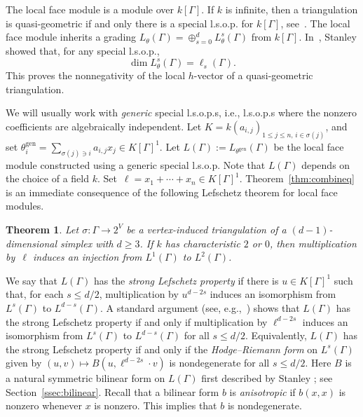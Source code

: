 \documentclass[11pt]{article}
\newtheorem{theo}{Theorem}[section]
\theoremstyle{definition}
\numberwithin{equation}{section}
\numberwithin{equation}{section}
\begin{document}
The local face module is a module over $k[\Gamma]$. If $k$ is infinite, then a triangulation is quasi-geometric if and only there is a special l.s.o.p. for $k[\Gamma]$, see~\cite[Corollary~4.4]{Stanleylocalh}. The local face module inherits a grading $L_{\theta}(\Gamma) = \oplus_{s = 0}^d  L^s_{\theta}(\Gamma)$ 
from $k[\Gamma]$. 
In~\cite[Theorem 4.6]{Stanleylocalh}, Stanley showed that, for any special l.s.o.p., 
$$\dim L^s_{\theta}(\Gamma) = \ell_s(\Gamma).$$
This proves the nonnegativity of the local $h$-vector of a quasi-geometric triangulation. 

We will usually work with \emph{generic} special l.s.o.p.s, i.e., l.s.o.p.s where the nonzero coefficients are algebraically independent. Let $K = k(a_{i,j})_{1 \le j \le n, \, i \in \sigma(j)}$, and set $\theta_i^{\operatorname{gen}} = \sum_{\sigma(j) \ni i} a_{i,j} x_j \in K[\Gamma]^1$. Let $L(\Gamma) := L_{\theta^{\operatorname{gen}}}(\Gamma)$ be the local face module constructed using a generic special l.s.o.p. Note that $L(\Gamma)$ depends on the choice of a field $k$. Set~$\ell = x_1 + \dotsb + x_n \in K[\Gamma]^1$. 
Theorem~\ref{thm:combineq} is an immediate consequence of the following Lefschetz theorem for local face modules. 

\begin{theo}\label{thm:WL}
Let $\sigma \colon \Gamma \to 2^V$ be a vertex-induced triangulation of a $(d-1)$-dimensional simplex with $d \ge 3$. If $k$ has characteristic $2$ or $0$, then multiplication by~$\ell$ induces an injection from $L^1(\Gamma)$ to $L^2(\Gamma)$. 
\end{theo}

We say that $L(\Gamma)$ has the \emph{strong Lefschetz property} if there is $u \in K[\Gamma]^1$ such that, for each $s \le d/2$, multiplication by $u^{d- 2s}$ induces an isomorphism from $L^s(\Gamma)$ to $L^{d-s}(\Gamma)$. A standard argument (see, e.g.,~\cite[Lemma 5.1]{LNS}) shows that $L(\Gamma)$ has the strong Lefschetz property if and only if multiplication by $\ell^{d- 2s}$ induces an isomorphism from $L^s(\Gamma)$ to $L^{d-s}(\Gamma)$ for all $s \le d/2$. 
Equivalently, $L(\Gamma)$ has the strong Lefschetz property if and only if the \emph{Hodge--Riemann form} on $L^s(\Gamma)$ given by $(u, v) \mapsto B(u, \ell^{d - 2s} \cdot v)$ is nondegenerate  for all $s \le d/2$. Here $B$ is a natural symmetric bilinear form on $L(\Gamma)$ first described by Stanley 
\cite[Corollary 4.19]{Stanleylocalh}; see Section~\ref{ssec:bilinear}. 
Recall that a bilinear form $b$ is \emph{anisotropic} if $b(x,x)$ is nonzero whenever $x$ is nonzero. This implies that $b$ is nondegenerate. 
\end{document}
